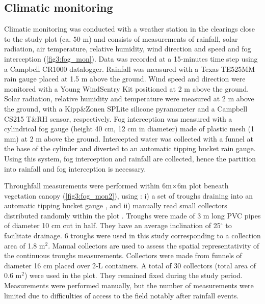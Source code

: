 \documentclass[a4paper,12pt]{article}
\begin{document}
\begin{linenumbers}
\subsection{Climatic monitoring} \label{sec:fog_int_moni}
Climatic monitoring was conducted with a weather station in the clearings close to the study plot (ca. $50$ $\mathrm{m}$) and consists of measurements of rainfall, solar radiation, air temperature, relative humidity, wind direction and speed and fog interception (\autoref{fig3:fog_mon}). Data was recorded at a 15-minutes time step using a Campbell CR1000 datalogger. Rainfall was measured with a Texas TE525MM rain gauge placed at 1.5 m above the ground. Wind speed and direction were monitored with a Young WindSentry Kit positioned at 2 m above the ground. Solar radiation, relative humidity and temperature were measured at 2 m above the ground, with a Kipp\&Zonen SPLite silicone pyranometer and a Campbell CS215 T\&RH sensor, respectively. Fog interception was measured with a cylindrical fog gauge (height 40 cm, 12 cm in diameter) made of plastic mesh (1 mm) at 2 m above the ground. Intercepted water was collected with a funnel at the base of the cylinder and diverted to an automatic tipping bucket rain gauge. Using this system, fog interception and rainfall are collected, hence the partition into rainfall and fog interception is necessary.


Throughfall measurements were performed within 6m$\times$6m plot beneath vegetation canopy (\autoref{fig3:fog_mon2}), using \citep{Dominguez2011, Pryetetal2012a}: i) a set of troughs draining into an automatic tipping bucket gauge \citep{Ziegleretal2009, Holwerdaetal2010, Zimmermannetal2014}, and ii) manually read small collectors distributed randomly within the plot \citep{Keimetal2005, Staelensetal2006, Zimmermannetal2009}. Troughs were made of 3 m long PVC pipes of diameter 10 cm cut in half. They have an average inclination of 25$^\circ$ to facilitate drainage. 6 troughs were used in this study corresponding to a collection area of 1.8 m$^2$. Manual collectors are used to assess the spatial representativity of the continuous troughs measurements. Collectors were made from funnels of diameter 16 cm placed over 2-L containers. A total of 30 collectors (total area of 0.6 m$^2$) were used in the plot. They remained fixed during the study period. Measurements were performed manually, but the number of measurements were limited due to difficulties of access to the field notably after rainfall events. 



\end{linenumbers}
\end{document}
